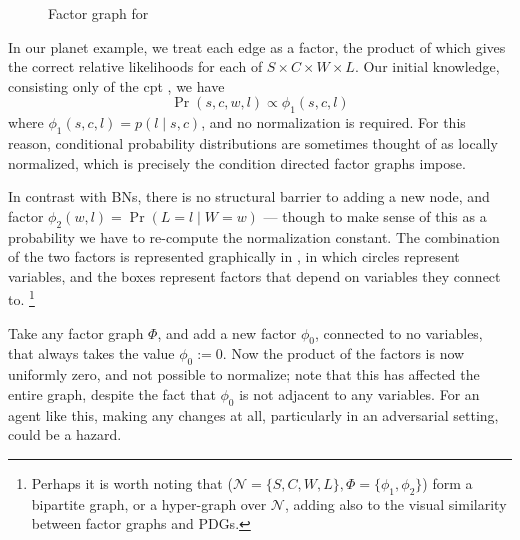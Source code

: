 \documentclass{article}
\newcommand{\vfullfootnote}[1]{}
\renewcommand{\vfullfootnote}[1]{\footnote{#1}}
\newcommand{\MN}{PDG}
\newcommand{\MNs}{\MN s}
\numberwithin{equation}{section}
\begin{document}
	
	\begin{example}[continues=ex:planet]
		\begin{figure}[h]
			\centering
			\caption{Factor graph for }
			\label{fig:planet-factorgraph}
		\end{figure}
	
		In our planet example, we treat each edge as a factor, the product of which gives the correct relative likelihoods for each of $S \times C \times W \times L$. Our initial knowledge, consisting only of the cpt , we have 
		\[ \Pr(s, c, w, l) \propto \phi_1(s,c,l)  \]
		where $\phi_1(s,c,l) = p(l \mid s,c)$, and no normalization is required. For this reason, conditional probability distributions are sometimes thought of as locally normalized, which is precisely the condition directed factor graphs \parencite{frey2012extending} impose.

		In contrast with BNs, there is no structural barrier to adding a new node, and factor $\phi_2(w,l) \!=\! \Pr(L\!=\!l\mid W\!=\!w)$ --- though to make sense of this as a probability we have to re-compute the normalization constant. The combination of the two factors is represented graphically in , in which circles represent variables, and the boxes represent factors that depend on variables they connect to. 
		 	\vfullfootnote{Perhaps it is worth noting that ($\mathcal N \!=\! \{S,C,W,L\}, \Phi \!=\! \{\phi_1,\phi_2\}$) form a bipartite graph, or a hyper-graph over $\mathcal N$, adding also to the visual similarity between factor graphs and \MNs. }
	\end{example}	
	\begin{example}\label{ex:fg-volatile}
		Take any factor graph $\Phi$, and add a new factor $\phi_0$, connected to no variables, that always takes the value $\phi_0 := 0$. Now the product of the factors is now uniformly zero, and not possible to normalize; note that this has affected the entire graph, despite the fact that $\phi_0$ is not adjacent to any variables. For an agent like this, making any changes at all, particularly in an adversarial setting, could be a hazard.
	\end{example}
\end{document}
